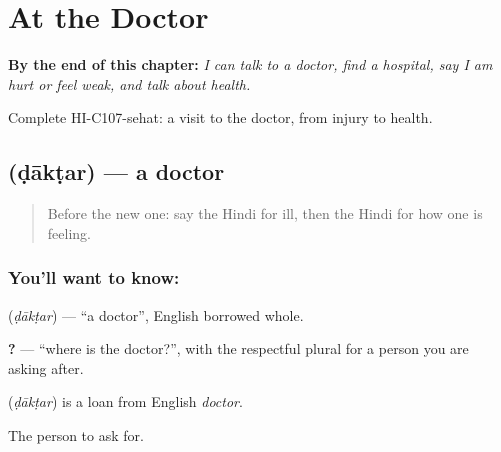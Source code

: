 
\chapter{At the Doctor}
\label{ch:hi-at-the-doctor}

\begin{chapteropening}
\textbf{By the end of this chapter:} \emph{I can talk to a doctor, find a hospital, say I am hurt or feel weak, and talk about health.}

Complete HI-C107-sehat: a visit to the doctor, from injury to health.
\end{chapteropening}

\section[\texorpdfstring{\hi{डाक्टर} (ḍākṭar)}{डाक्टर (ḍākṭar)}]{ (ḍākṭar) — a doctor}

\label{lesson:HI-C107-doctor}



\begin{quote}
Before the new one: say the Hindi for ill, then the Hindi for how one is feeling.
\end{quote}

\subsection*{You'll want to know: }
\textbf{} (\emph{ḍākṭar}) — \textquotedblleft{}a doctor\textquotedblright{}, English borrowed whole.

\textbf{  ?} — \textquotedblleft{}where is the doctor?\textquotedblright{}, with the respectful plural \textbf{} for a person you are asking after.

\begin{cousinweb}
\textbf{} (\emph{ḍākṭar}) is a loan from English \emph{doctor}.
\end{cousinweb}

\begin{grammarlens}[title={What you've built}]
The person to ask for.
\end{grammarlens}

